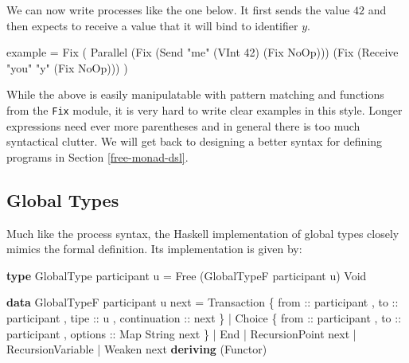 \documentclass[runningheads,plain]{llncs}
\newenvironment{Shaded}{}{}
\newcommand{\KeywordTok}[1]{\textcolor[rgb]{0.00,0.44,0.13}{\textbf{#1}}}
\newcommand{\DataTypeTok}[1]{\textcolor[rgb]{0.56,0.13,0.00}{#1}}
\newcommand{\DecValTok}[1]{\textcolor[rgb]{0.25,0.63,0.44}{#1}}
\newcommand{\StringTok}[1]{\textcolor[rgb]{0.25,0.44,0.63}{#1}}
\newcommand{\OtherTok}[1]{\textcolor[rgb]{0.00,0.44,0.13}{#1}}
\newcommand{\FunctionTok}[1]{\textcolor[rgb]{0.02,0.16,0.49}{#1}}
\newcommand{\NormalTok}[1]{#1}
\begin{document}
We can now write processes like the one below. It first sends the value $42$ and then expects to receive a value that it will bind to identifier $y$.

\begin{Shaded}
\begin{Highlighting}[]
\NormalTok{example }\FunctionTok{=} 
    \DataTypeTok{Fix} 
\NormalTok{        ( }\DataTypeTok{Parallel} 
\NormalTok{            (}\DataTypeTok{Fix}\NormalTok{ (}\DataTypeTok{Send} \StringTok{"me"}\NormalTok{ (}\DataTypeTok{VInt} \DecValTok{42}\NormalTok{) (}\DataTypeTok{Fix} \DataTypeTok{NoOp}\NormalTok{)))}
\NormalTok{            (}\DataTypeTok{Fix}\NormalTok{ (}\DataTypeTok{Receive} \StringTok{"you"} \StringTok{"y"}\NormalTok{ (}\DataTypeTok{Fix} \DataTypeTok{NoOp}\NormalTok{)))}
\NormalTok{        )}
\end{Highlighting}
\end{Shaded}

While the above is easily manipulatable with pattern matching and
functions from the \texttt{Fix} module, it is very hard to write clear
examples in this style. Longer expressions need ever more parentheses
and in general there is too much syntactical clutter. We will get back
to designing a better syntax for defining programs in Section
\ref{free-monad-dsl}.

\subsection{Global Types}

Much like the process syntax, the Haskell implementation of global types closely mimics the formal definition.
Its implementation is given by: 

\begin{Shaded}
\begin{Highlighting}[]
\KeywordTok{type} \DataTypeTok{GlobalType}\NormalTok{ participant u }\FunctionTok{=} 
    \DataTypeTok{Free}\NormalTok{ (}\DataTypeTok{GlobalTypeF}\NormalTok{ participant u) }\DataTypeTok{Void}

\KeywordTok{data} \DataTypeTok{GlobalTypeF}\NormalTok{ participant u next}
    \FunctionTok{=} \DataTypeTok{Transaction} 
\NormalTok{        \{}\OtherTok{ from ::}\NormalTok{ participant}
\NormalTok{        ,}\OtherTok{ to ::}\NormalTok{ participant}
\NormalTok{        ,}\OtherTok{ tipe ::}\NormalTok{ u}
\NormalTok{        ,}\OtherTok{ continuation ::}\NormalTok{  next }
\NormalTok{        \} }
    \FunctionTok{|} \DataTypeTok{Choice} 
\NormalTok{        \{}\OtherTok{ from ::}\NormalTok{ participant}
\NormalTok{        ,}\OtherTok{ to ::}\NormalTok{ participant}
\NormalTok{        ,}\OtherTok{ options ::} \DataTypeTok{Map} \DataTypeTok{String}\NormalTok{ next }
\NormalTok{        \}}
    \FunctionTok{|} \DataTypeTok{End}
    \FunctionTok{|} \DataTypeTok{RecursionPoint}\NormalTok{ next}
    \FunctionTok{|} \DataTypeTok{RecursionVariable}
    \FunctionTok{|} \DataTypeTok{Weaken}\NormalTok{ next}
    \KeywordTok{deriving}\NormalTok{ (}\DataTypeTok{Functor}\NormalTok{)}
\end{Highlighting}
\end{Shaded}
\end{document}
